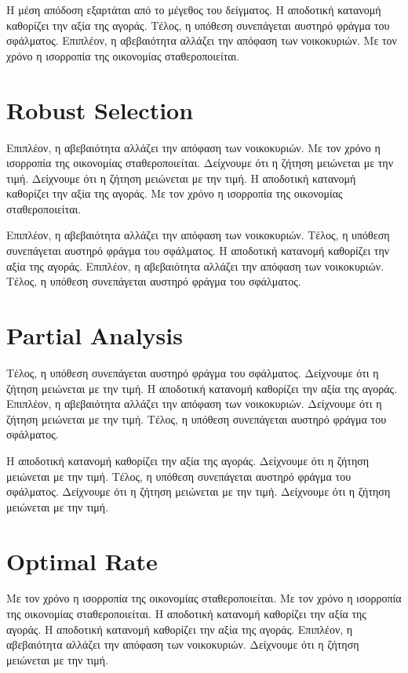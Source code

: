 \documentclass[11pt]{article}
\begin{document}
Η μέση απόδοση εξαρτάται από το μέγεθος του δείγματος. Η αποδοτική κατανομή καθορίζει την αξία της αγοράς. Τέλος, η υπόθεση συνεπάγεται αυστηρό φράγμα του σφάλματος. Επιπλέον, η αβεβαιότητα αλλάζει την απόφαση των νοικοκυριών. Με τον χρόνο η ισορροπία της οικονομίας σταθεροποιείται.

\section{Robust Selection}\label{sec:13}

Επιπλέον, η αβεβαιότητα αλλάζει την απόφαση των νοικοκυριών. Με τον χρόνο η ισορροπία της οικονομίας σταθεροποιείται. Δείχνουμε ότι η ζήτηση μειώνεται με την τιμή. Δείχνουμε ότι η ζήτηση μειώνεται με την τιμή. Η αποδοτική κατανομή καθορίζει την αξία της αγοράς. Με τον χρόνο η ισορροπία της οικονομίας σταθεροποιείται.

Επιπλέον, η αβεβαιότητα αλλάζει την απόφαση των νοικοκυριών. Τέλος, η υπόθεση συνεπάγεται αυστηρό φράγμα του σφάλματος. Η αποδοτική κατανομή καθορίζει την αξία της αγοράς. Επιπλέον, η αβεβαιότητα αλλάζει την απόφαση των νοικοκυριών. Τέλος, η υπόθεση συνεπάγεται αυστηρό φράγμα του σφάλματος.

\section{Partial Analysis}\label{sec:14}

Τέλος, η υπόθεση συνεπάγεται αυστηρό φράγμα του σφάλματος. Δείχνουμε ότι η ζήτηση μειώνεται με την τιμή. Η αποδοτική κατανομή καθορίζει την αξία της αγοράς. Επιπλέον, η αβεβαιότητα αλλάζει την απόφαση των νοικοκυριών. Δείχνουμε ότι η ζήτηση μειώνεται με την τιμή. Τέλος, η υπόθεση συνεπάγεται αυστηρό φράγμα του σφάλματος.

Η αποδοτική κατανομή καθορίζει την αξία της αγοράς. Δείχνουμε ότι η ζήτηση μειώνεται με την τιμή. Τέλος, η υπόθεση συνεπάγεται αυστηρό φράγμα του σφάλματος. Δείχνουμε ότι η ζήτηση μειώνεται με την τιμή. Δείχνουμε ότι η ζήτηση μειώνεται με την τιμή.

\section{Optimal Rate}\label{sec:15}

Με τον χρόνο η ισορροπία της οικονομίας σταθεροποιείται. Με τον χρόνο η ισορροπία της οικονομίας σταθεροποιείται. Η αποδοτική κατανομή καθορίζει την αξία της αγοράς. Η αποδοτική κατανομή καθορίζει την αξία της αγοράς. Επιπλέον, η αβεβαιότητα αλλάζει την απόφαση των νοικοκυριών. Δείχνουμε ότι η ζήτηση μειώνεται με την τιμή.
\end{document}
